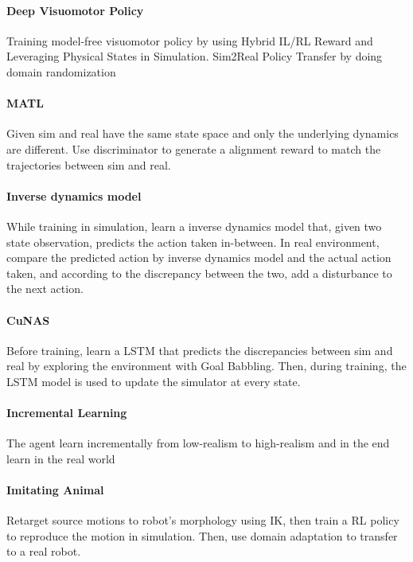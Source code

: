 \paragraph{Deep Visuomotor Policy~\citep{zhu2018reinforcement}}
Training model-free visuomotor policy by using Hybrid IL/RL Reward and Leveraging Physical States in Simulation. Sim2Real Policy Transfer by doing domain randomization

\paragraph{MATL~\citep{Wulfmeier2017mutual}}
Given sim and real have the same state space and only the underlying dynamics are different. Use discriminator to generate a alignment reward to match the trajectories between sim and real. 

\paragraph{Inverse dynamics model~\citep{Malmir2020Robust}}
While training in simulation, learn a inverse dynamics model that, given two state observation, predicts the action taken in-between. In real environment, compare the predicted action by inverse dynamics model and the actual action taken, and according to the discrepancy between the two, add a disturbance to the next action.

\paragraph{CuNAS~\citep{Hochreiter2020Long}}
Before training, learn a LSTM that predicts the discrepancies between sim and real by exploring the environment with Goal Babbling. Then, during training, the LSTM model is used to update the simulator at every state.

\paragraph{Incremental Learning~\citep{Josifovski2020Continual}}
The agent learn incrementally from low-realism to high-realism and in the end learn in the real world

\paragraph{Imitating Animal~\citep{peng2020learning}}
Retarget source motions to robot's morphology using IK, then train a RL policy to reproduce the motion in simulation. Then, use domain adaptation to transfer to a real robot.

